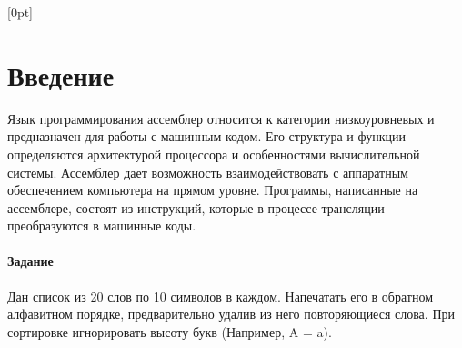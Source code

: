 \documentclass[a4paper,14pt]{article}
\begin{document}
\titleformat{\section}[block]{\Large\bfseries\centering}{}{0pt}{}

\renewcommand{\thesubsection}{\S\arabic{subsection}}
\titleformat{\subsection}[block]{\large\bfseries}{\thesubsection}{1em}{}

[0pt] %
{\vspace{0.5ex}\hspace{1em}} %
{} %
{} %
{\contentspage} %

\renewcommand{\contentsname}{\leftline{\fontsize{24.5pt}{30pt}\selectfont Содержание}}

\tableofcontents

\newpage

\section{Введение}

Язык программирования ассемблер относится к категории низкоуровневых и предназначен для работы с машинным кодом. Его структура и функции определяются архитектурой процессора и особенностями вычислительной системы. Ассемблер дает возможность взаимодействовать с аппаратным обеспечением компьютера на прямом уровне. Программы, написанные на ассемблере, состоят из инструкций, которые в процессе трансляции преобразуются в машинные коды. \newline

\paragraph{Задание \newline}
Дан список из 20 слов по 10 символов в каждом. Напечатать его в
обратном алфавитном порядке, предварительно удалив из него
повторяющиеся слова. При сортировке игнорировать высоту букв
(Например, A = a).
\end{document}
